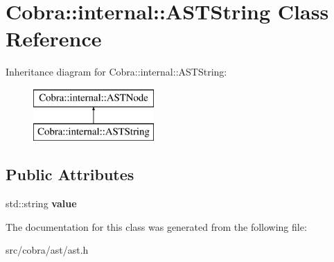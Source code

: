 \hypertarget{class_cobra_1_1internal_1_1_a_s_t_string}{\section{Cobra\+:\+:internal\+:\+:A\+S\+T\+String Class Reference}
\label{class_cobra_1_1internal_1_1_a_s_t_string}
}
Inheritance diagram for Cobra\+:\+:internal\+:\+:A\+S\+T\+String\+:\begin{figure}[H]
\begin{center}
\leavevmode
\includegraphics[height=2.000000cm]{class_cobra_1_1internal_1_1_a_s_t_string}
\end{center}
\end{figure}
\subsection*{Public Attributes}
\begin{DoxyCompactItemize}
\item 
\hypertarget{class_cobra_1_1internal_1_1_a_s_t_string_a91fd89c1cf9442e5df35d19e6fe6a465}{std\+::string {\bfseries value}}\label{class_cobra_1_1internal_1_1_a_s_t_string_a91fd89c1cf9442e5df35d19e6fe6a465}

\end{DoxyCompactItemize}


The documentation for this class was generated from the following file\+:\begin{DoxyCompactItemize}
\item 
src/cobra/ast/ast.\+h\end{DoxyCompactItemize}
